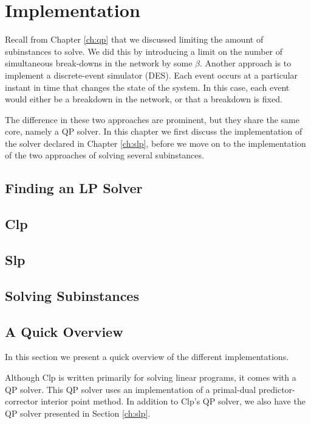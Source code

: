 \chapter{Implementation}
Recall from Chapter \ref{ch:qp} that we discussed limiting the amount
of subinstances to solve. We did this by introducing a limit on the number of
simultaneous break-downs in the network by some $\beta$.
Another approach is to implement a discrete-event simulator (DES). Each event
occurs at a particular instant in time that changes the state of the system.
In this case, each event would either be a breakdown in the network, or that
a breakdown is fixed.

The difference in these two approaches are prominent, but they share the same
core, namely a QP solver. In this chapter we first discuss the implementation
of the solver declared in Chapter \ref{ch:slp}, before we move on to the
implementation of the two approaches of solving several subinstances.
\label{ch:implementation}

\section{Finding an LP Solver}


\section{Clp}


\section{Slp}


\section{Solving Subinstances}


\section{A Quick Overview}
In this section we present a quick overview of the different
implementations.

Although Clp is written primarily for solving linear
programs, it comes with a QP solver. This QP solver uses an implementation
of a primal-dual predictor-corrector interior point method. In addition
to Clp's QP solver, we also have the QP solver presented in Section
\ref{ch:slp}.


